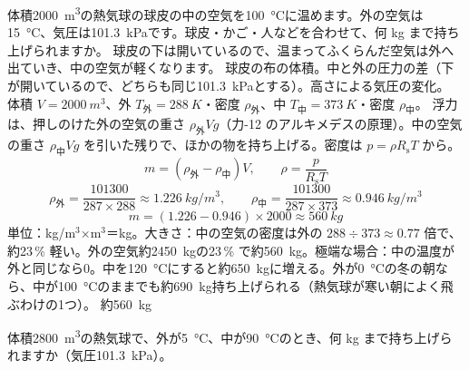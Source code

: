 \begin{phreidai}[熱気球が持ち上げられる重さ]
\label{ph:熱-3:ex14}体積\qty{2000}{m^3}の熱気球の球皮の中の空気を\qty{100}{\celsius}に温めます。外の空気は\qty{15}{\celsius}、気圧は\qty{101.3}{kPa}です。球皮・かご・人などを合わせて、何 kg まで持ち上げられますか。
\phbamen
球皮の下は開いているので、温まってふくらんだ空気は外へ出ていき、中の空気が軽くなります。
\phmushi
球皮の布の体積。中と外の圧力の差（下が開いているので、どちらも同じ\qty{101.3}{kPa}とする）。高さによる気圧の変化。
\phzu
体積 $V=\qty{2000}{m^3}$、外 $T_{\text{外}}=\qty{288}{K}$・密度 $\rho_{\text{外}}$、中 $T_{\text{中}}=\qty{373}{K}$・密度 $\rho_{\text{中}}$。
\phriyu
浮力は、押しのけた外の空気の重さ $\rho_{\text{外}}Vg$（力-12 のアルキメデスの原理）。中の空気の重さ $\rho_{\text{中}}Vg$ を引いた残りで、ほかの物を持ち上げる。密度は $p=\rho R_{\mathrm s}T$ から。
\phtateru
\[ m=(\rho_{\text{外}}-\rho_{\text{中}})V,\qquad \rho=\frac{p}{R_{\mathrm s}T} \]
\phtoku
\[ \rho_{\text{外}}=\frac{\num{101300}}{287\times288}\approx\qty{1.226}{kg/m^3},\qquad \rho_{\text{中}}=\frac{\num{101300}}{287\times373}\approx\qty{0.946}{kg/m^3} \]
\[ m=(1.226-0.946)\times2000\approx\qty{560}{kg} \]
\phtashikame
単位：kg/m$^3$×m$^3$＝kg。大きさ：中の空気の密度は外の $288\div373\approx0.77$ 倍で、約23\,\% 軽い。外の空気約\qty{2450}{kg}の23\,\% で約\qty{560}{kg}。極端な場合：中の温度が外と同じなら0。中を\qty{120}{\celsius}にすると約\qty{650}{kg}に増える。外が\qty{0}{\celsius}の冬の朝なら、中が\qty{100}{\celsius}のままでも約\qty{690}{kg}持ち上げられる（熱気球が寒い朝によく飛ぶわけの1つ）。
\kotae 約\qty{560}{kg}
\end{phreidai}
\begin{jibun}
体積\qty{2800}{m^3}の熱気球で、外が\qty{5}{\celsius}、中が\qty{90}{\celsius}のとき、何 kg まで持ち上げられますか（気圧\qty{101.3}{kPa}）。
\end{jibun}

